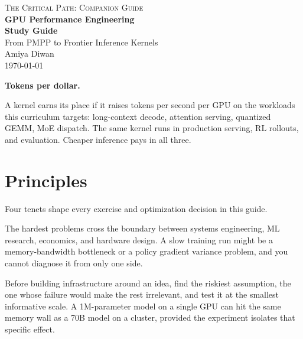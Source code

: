 \documentclass[11pt, letterpaper]{article}
\begin{document}
\begin{titlepage}
\centering
\vspace*{2cm}
{\large\scshape The Critical Path: Companion Guide}\\[0.5cm]
{\Huge\bfseries GPU Performance Engineering}\\[0.3cm]
{\LARGE\bfseries Study Guide}\\[0.8cm]
{\Large From PMPP to Frontier Inference Kernels}\\[2.5cm]
{\large Amiya Diwan}\\[0.8cm]
{\today}
\vfill
\begin{northstar}
\textbf{Tokens per dollar.}

\smallskip
A kernel earns its place if it raises tokens per second per GPU on the workloads this curriculum targets: long-context decode, attention serving, quantized GEMM, MoE dispatch. The same kernel runs in production serving, RL rollouts, and evaluation. Cheaper inference pays in all three.
\end{northstar}
\vspace{1cm}
\end{titlepage}

\thispagestyle{empty}
\vspace*{1cm}
\section*{Principles}

Four tenets shape every exercise and optimization decision in this guide.

\begin{principle}
The hardest problems cross the boundary between systems engineering, ML research, economics, and hardware design. A slow training run might be a memory-bandwidth bottleneck or a policy gradient variance problem, and you cannot diagnose it from only one side.
\end{principle}

\begin{principle}
Before building infrastructure around an idea, find the riskiest assumption, the one whose failure would make the rest irrelevant, and test it at the smallest informative scale. A 1M-parameter model on a single GPU can hit the same memory wall as a 70B model on a cluster, provided the experiment isolates that specific effect.
\end{principle}
\end{document}
